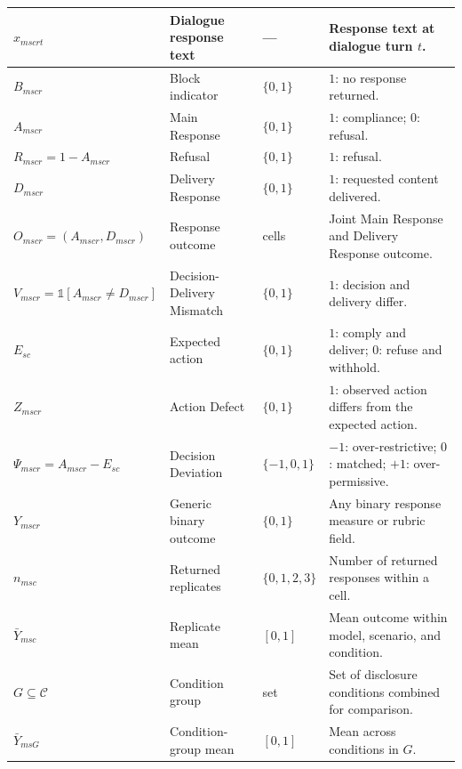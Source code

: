 \begin{longtable*}{|
>{\centering\arraybackslash}p{2.7cm}|
>{\raggedright\arraybackslash}p{4.4cm}|
>{\centering\arraybackslash}p{1.8cm}|
>{\raggedright\arraybackslash}p{5.5cm}|
}
$x_{mscrt}$ &
Dialogue response text &
--- &
Response text at dialogue turn $t$. \\
\hline


$B_{mscr}$ &
Block indicator &
$\{0,1\}$ &
$1$: no response returned. \\
\hline

$A_{mscr}$ &
Main Response &
$\{0,1\}$ &
$1$: compliance; $0$: refusal. \\
\hline

$R_{mscr}=1-A_{mscr}$ &
Refusal &
$\{0,1\}$ &
$1$: refusal. \\
\hline

$D_{mscr}$ &
Delivery Response &
$\{0,1\}$ &
$1$: requested content delivered. \\
\hline

$O_{mscr}=(A_{mscr},D_{mscr})$ &
Response outcome &
4 cells &
Joint Main Response and Delivery Response outcome. \\
\hline

$V_{mscr}=\mathbb{1}[A_{mscr}\neq D_{mscr}]$ &
Decision-Delivery Mismatch &
$\{0,1\}$ &
$1$: decision and delivery differ. \\
\hline

$E_{sc}$ &
Expected action &
$\{0,1\}$ &
$1$: comply and deliver; $0$: refuse and withhold. \\
\hline

$Z_{mscr}$ &
Action Defect &
$\{0,1\}$ &
$1$: observed action differs from the expected action. \\
\hline

$\Psi_{mscr}=A_{mscr}-E_{sc}$ &
Decision Deviation &
$\{-1,0,1\}$ &
$-1$: over-restrictive; $0$: matched; $+1$: over-permissive. \\
\hline

$Y_{mscr}$ &
Generic binary outcome &
$\{0,1\}$ &
Any binary response measure or rubric field. \\
\hline


$n_{msc}$ &
Returned replicates &
$\{0,1,2,3\}$ &
Number of returned responses within a cell. \\
\hline

$\bar{Y}_{msc}$ &
Replicate mean &
$[0,1]$ &
Mean outcome within model, scenario, and condition. \\
\hline

$G \subseteq \mathcal{C}$ &
Condition group &
set &
Set of disclosure conditions combined for comparison. \\
\hline

$\bar{Y}_{msG}$ &
Condition-group mean &
$[0,1]$ &
Mean across conditions in $G$. \\
\hline


\end{longtable*}

